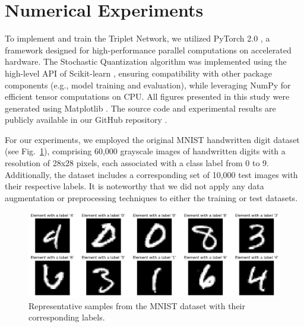 \section{Numerical Experiments}

To implement and train the Triplet Network, we utilized PyTorch 2.0 \cite{Ansel_2024}, a framework designed for high-performance parallel computations on accelerated hardware. The Stochastic Quantization algorithm was implemented using the high-level API of Scikit-learn \cite{Pedregosa_2011}, ensuring compatibility with other package components (e.g., model training and evaluation), while leveraging NumPy \cite{harris2020array} for efficient tensor computations on CPU. All figures presented in this study were generated using Matplotlib \cite{Hunter_2007}. The source code and experimental results are publicly available in our GitHub repository \cite{Kozyriev_2024}.

For our experiments, we employed the original MNIST handwritten digit dataset \cite{lecun2010mnist} (see Fig.~\ref{mnist:fig}), comprising 60,000 grayscale images of handwritten digits with a resolution of 28x28 pixels, each associated with a class label from 0 to 9. Additionally, the dataset includes a corresponding set of 10,000 test images with their respective labels. It is noteworthy that we did not apply any data augmentation or preprocessing techniques to either the training or test datasets.

\begin{figure}
    \centering
    \includegraphics[width=\textwidth]{figures/dataset.png}
    \caption{Representative samples from the MNIST dataset \cite{lecun2010mnist} with their corresponding labels.}
    \label{mnist:fig}
\end{figure}

